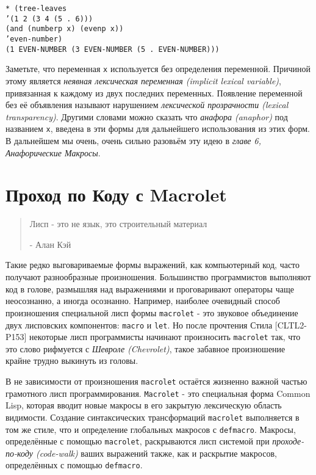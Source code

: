 \begin{verbatim}
* (tree-leaves
’(1 2 (3 4 (5 . 6)))
(and (numberp x) (evenp x))
’even-number)
(1 EVEN-NUMBER (3 EVEN-NUMBER (5 . EVEN-NUMBER)))
\end{verbatim}

Заметьте, что переменная \verb"x" используется без определения переменной. Причиной этому является \emph{неявная лексическая переменная (implicit lexical variable)}, привязанная к каждому из двух последних переменных. Появление переменной без её объявления называют нарушением \emph{лексической прозрачности (lexical transparency)}. Другими словами можно сказать что \emph{анафора (anaphor)} под названием \verb"x", введена в эти формы для дальнейшего использования из этих форм. В дальнейшем мы очень, очень сильно разовьём эту идею в \emph{главе 6, Анафорические Макросы}.

\section{Проход по Коду с Macrolet}\label{section_code-walking_with_macrolet}

\begin{quote}
Лисп - это не язык, это строительный материал

- Алан Кэй
\end{quote}

Такие редко выговариваемые формы выражений, как компьютерный код, часто получают разнообразные произношения. Большинство программистов выполняют код в голове, размышляя над выражениями и проговаривают операторы чаще неосознанно, а иногда осознанно. Например, наиболее очевидный способ произношения специальной лисп формы \verb"macrolet" - это звуковое объединение двух лисповских компонентов: \verb"macro" и \verb"let". Но после прочтения Стила [CLTL2-P153] некоторые лисп программисты начинают произносить \verb"macrolet" так, что это слово рифмуется с \emph{Шевроле (Chevrolet)}, такое забавное произношение крайне трудно выкинуть из головы.

В не зависимости от произношения \verb"macrolet" остаётся жизненно важной частью грамотного лисп программирования. \verb"Macrolet" - это специальная форма Common Lisp, которая вводит новые макросы в его закрытую лексическую область видимости. Создание синтаксических трансформаций \verb"macrolet" выполняется в том же стиле, что и определение глобальных макросов с \verb"defmacro". Макросы, определённые с помощью \verb"macrolet", раскрываются лисп системой при \emph{проходе-по-коду (code-walk)} ваших выражений также, как и раскрытие макросов, определённых с помощью \verb"defmacro".

